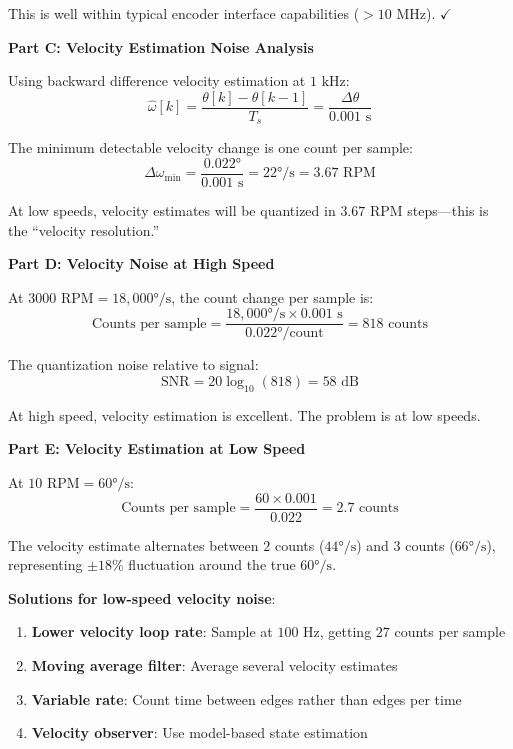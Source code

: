 \begin{example}
This is well within typical encoder interface capabilities ($>10\text{ MHz}$). $\checkmark$

\textbf{Part C: Velocity Estimation Noise Analysis}

Using backward difference velocity estimation at $1\text{ kHz}$:
\begin{equation}
\hat{\omega}[k] = \frac{\theta[k] - \theta[k-1]}{T_s} = \frac{\Delta\theta}{0.001\text{ s}}
\end{equation}

The minimum detectable velocity change is one count per sample:
\begin{equation}
\Delta\omega_{\min} = \frac{0.022°}{0.001\text{ s}} = 22°/\text{s} = 3.67\text{ RPM}
\end{equation}

At low speeds, velocity estimates will be quantized in $3.67\text{ RPM}$ steps---this is the ``velocity resolution.''

\textbf{Part D: Velocity Noise at High Speed}

At $3000\text{ RPM} = 18{,}000°/\text{s}$, the count change per sample is:
\begin{equation}
\text{Counts per sample} = \frac{18{,}000°/\text{s} \times 0.001\text{ s}}{0.022°/\text{count}} = 818\text{ counts}
\end{equation}

The quantization noise relative to signal:
\begin{equation}
\text{SNR} = 20\log_{10}(818) = 58\text{ dB}
\end{equation}

At high speed, velocity estimation is excellent. The problem is at low speeds.

\textbf{Part E: Velocity Estimation at Low Speed}

At $10\text{ RPM} = 60°/\text{s}$:
\begin{equation}
\text{Counts per sample} = \frac{60 \times 0.001}{0.022} = 2.7\text{ counts}
\end{equation}

The velocity estimate alternates between $2$ counts ($44°/\text{s}$) and $3$ counts ($66°/\text{s}$), representing $\pm 18\%$ fluctuation around the true $60°/\text{s}$.

\textbf{Solutions for low-speed velocity noise}:
\begin{enumerate}
    \item \textbf{Lower velocity loop rate}: Sample at $100\text{ Hz}$, getting $27$ counts per sample
    \item \textbf{Moving average filter}: Average several velocity estimates
    \item \textbf{Variable rate}: Count time between edges rather than edges per time
    \item \textbf{Velocity observer}: Use model-based state estimation
\end{enumerate}
\end{example}

